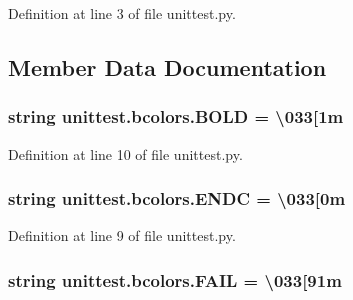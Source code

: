 Definition at line 3 of file unittest.\+py.



\subsection{Member Data Documentation}
\subsubsection[{\texorpdfstring{B\+O\+LD}{BOLD}}]{\setlength{\rightskip}{0pt plus 5cm}string unittest.\+bcolors.\+B\+O\+LD = \textquotesingle{}\textbackslash{}033\mbox{[}1m\textquotesingle{}\hspace{0.3cm}{\ttfamily [static]}}\hypertarget{classunittest_1_1bcolors_a95b491580216e848b313b0918ccea7ea}{}\label{classunittest_1_1bcolors_a95b491580216e848b313b0918ccea7ea}


Definition at line 10 of file unittest.\+py.

\subsubsection[{\texorpdfstring{E\+N\+DC}{ENDC}}]{\setlength{\rightskip}{0pt plus 5cm}string unittest.\+bcolors.\+E\+N\+DC = \textquotesingle{}\textbackslash{}033\mbox{[}0m\textquotesingle{}\hspace{0.3cm}{\ttfamily [static]}}\hypertarget{classunittest_1_1bcolors_a5db993c726eedb06b4a7efab09551f4e}{}\label{classunittest_1_1bcolors_a5db993c726eedb06b4a7efab09551f4e}


Definition at line 9 of file unittest.\+py.

\subsubsection[{\texorpdfstring{F\+A\+IL}{FAIL}}]{\setlength{\rightskip}{0pt plus 5cm}string unittest.\+bcolors.\+F\+A\+IL = \textquotesingle{}\textbackslash{}033\mbox{[}91m\textquotesingle{}\hspace{0.3cm}{\ttfamily [static]}}\hypertarget{classunittest_1_1bcolors_a2dada3141c1e833e5a3cacd4f39dcf47}{}\label{classunittest_1_1bcolors_a2dada3141c1e833e5a3cacd4f39dcf47}



